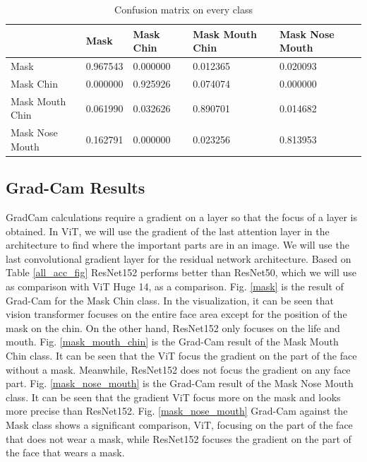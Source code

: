 \documentclass{article}
\begin{document}
\begin{table}[!b]
	\caption{Confusion matrix on every class}
	\label{cm_table}
	\centering
	\begin{tabular}{p{2.6cm}|p{2.6cm}p{2.6cm}p{2.6cm}p{2.6cm}}
		\hspace{2.5cm} & Mask & Mask Chin & Mask Mouth Chin & Mask Nose Mouth \\
		\hline
		Mask &
		0.967543 &
		0.000000 &
		0.012365 &
		0.020093 \\
		Mask Chin &
		0.000000 &
		0.925926 &
		0.074074 &
		0.000000 \\
		Mask Mouth Chin &
		0.061990 &
		0.032626 &
		0.890701 &
		0.014682 \\
		Mask Nose Mouth &
		0.162791 &
		0.000000 &
		0.023256 &
		0.813953 \\
	\end{tabular}
\end{table}


\subsection{Grad-Cam Results}
GradCam \citep{Selvaraju2020gradcam} calculations require a gradient on a layer so that the focus of a layer is obtained. In ViT, we will use the gradient of the last attention layer in the architecture to find where the important parts are in an image. We will use the last convolutional gradient layer for the residual network architecture. Based on Table \ref{all_acc_fig} ResNet152  \citep{he2015resnet} performs better than ResNet50, which we will use as comparison with ViT Huge 14, as a comparison. Fig. \ref{mask} is the result of Grad-Cam for the Mask Chin class. In the visualization, it can be seen that vision transformer focuses on the entire face area except for the position of the mask on the chin.
On the other hand, ResNet152 only focuses on the life and mouth. Fig. \ref{mask_mouth_chin} is the Grad-Cam result of the Mask Mouth Chin class. It can be seen that the ViT focus the gradient on the part of the face without a mask. Meanwhile, ResNet152 does not focus the gradient on any face part. Fig. \ref{mask_nose_mouth} is the Grad-Cam result of the Mask Nose Mouth class. It can be seen that the gradient ViT focus more on the mask and looks more precise than ResNet152. Fig. \ref{mask_nose_mouth} Grad-Cam against the Mask class shows a significant comparison, ViT, focusing on the part of the face that does not wear a mask, while ResNet152 focuses the gradient on the part of the face that wears a mask.
\end{document}
